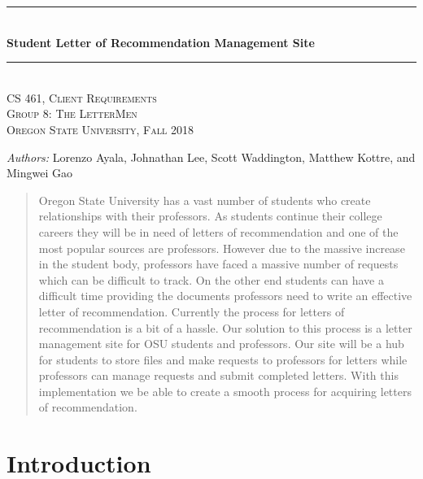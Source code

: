 \documentclass[onecolumn, draftclsnofoot,10pt, compsoc]{IEEEtran}
\begin{document}
\begin{titlepage}
    \newcommand{\HRule}{\rule{\linewidth}{0.5mm}}
    \center 
    \HRule \\[0.4cm]
    { \Large \bfseries Student Letter of Recommendation Management Site}\\[0.4cm] 
    \HRule \\[0.5cm]
    \center 
    \textsc{\Large CS 461, Client Requirements}\\[0.5cm] 
    \textsc{\Large Group 8: The LetterMen}\\[0.5cm]
    \textsc{\Large Oregon State University, Fall 2018}\\[0.5cm] 
    \begin{minipage}{0.4\textwidth}
        \begin{center} \large
        \emph{Authors:} Lorenzo Ayala, Johnathan Lee, Scott Waddington, Matthew Kottre, and Mingwei Gao
        \end{center}
    \end{minipage}
    \vspace{2cm}
    \begin{abstract}
    Oregon State University has a vast number of students who create relationships with their professors. As students continue their college careers they will be in need of letters of recommendation and one of the most popular sources are professors. However due to the massive increase in the student body, professors have faced a massive number of requests which can be difficult to track. On the other end students can have a difficult time providing the documents professors need to write an effective letter of recommendation. Currently the process for letters of recommendation is a bit of a hassle. Our solution to this process is a letter management site for OSU students and professors. Our site will be a hub for students to store files and make requests to professors for letters while professors can manage requests and submit completed letters. With this implementation we be able to create a smooth process for acquiring letters of recommendation.  
    \end{abstract}
    \vfill %
\end{titlepage}
\newpage
{}
\tableofcontents
\clearpage

\section{Introduction}
\end{document}
